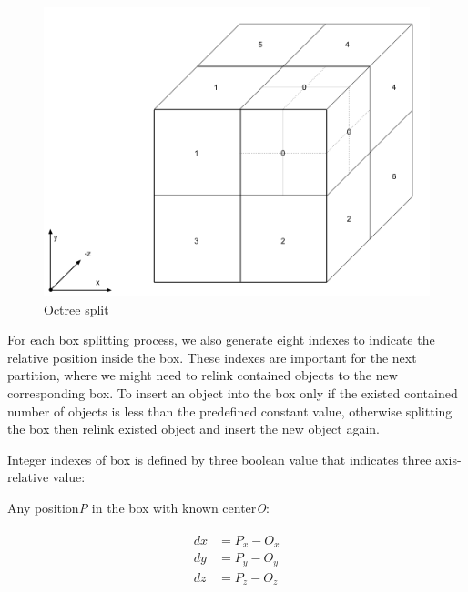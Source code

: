 \begin{figure}[H]
\caption[octree-split]{Octree split}
\label{fig:octree-split}
\centering
\includegraphics[width=\linewidth]{Figures/octree-split.png}
\decoRule
\end{figure}

For each box splitting process, we also generate eight indexes to indicate the relative position inside the box. These indexes are important for the next partition, where we might need to relink contained objects to the new corresponding box. To insert an object into
the box only if the existed contained number of objects is less than the predefined constant value, otherwise splitting the box then relink existed object and insert the new object again.

Integer indexes of box is defined by three boolean value that indicates three axis-relative value:

Any position\;\emph{P} in the box with known center\emph{O}:

\[
\begin{array}{lr}
\begin{aligned}
dx &= P_x - O_x\\
dy &= P_y - O_y\\
dz &= P_z - O_z\\
\end{aligned}
\end{array}
\]

